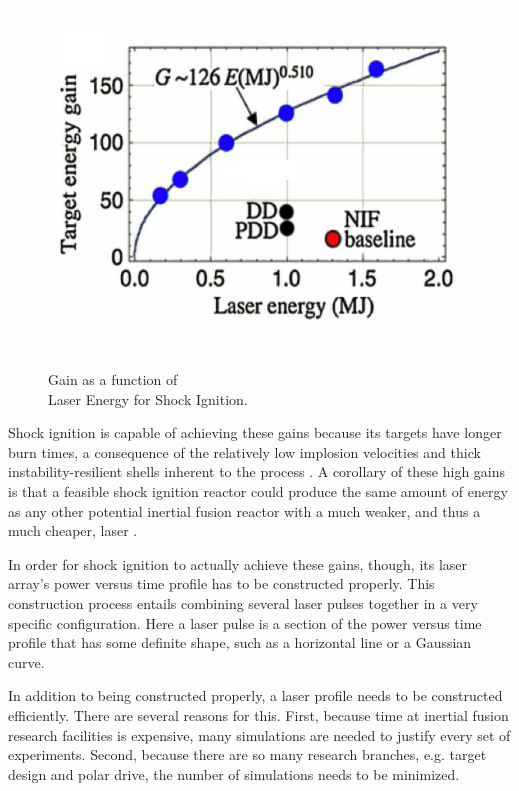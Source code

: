 \begin{figure}	
	\centering
	\caption[Gain Curve for Shock Ignition]{ \\ Gain as a function of \\ Laser Energy for Shock Ignition.   \\  }
	\includegraphics[scale=0.95]{graphics/gainCurve.png} 
	\label{fig:gainCurve}
\end{figure}


Shock ignition is capable of achieving these gains because its targets have longer burn times, a consequence of the relatively low implosion velocities and thick instability-resilient shells inherent to the process \citep{perkinsPaper}.  A corollary of these high gains is that a feasible shock ignition reactor could produce the same amount of energy as any other potential inertial fusion reactor with a much weaker, and thus a much cheaper, laser \citep{summaryPaper}.  

In order for shock ignition to actually achieve these gains, though, its laser array's power versus time profile has to be constructed properly.  This construction process entails combining several laser pulses together in a very specific configuration.  Here a laser pulse is a section of the power versus time profile that has some definite shape, such as a horizontal line or a Gaussian curve.  

In addition to being constructed properly, a laser profile needs to be constructed efficiently.  There are several reasons for this.  First, because time at inertial fusion research facilities is expensive, many simulations are needed to justify every set of experiments.  Second, because there are so many research branches, e.g. target design and polar drive, the number of simulations needs to be minimized.
